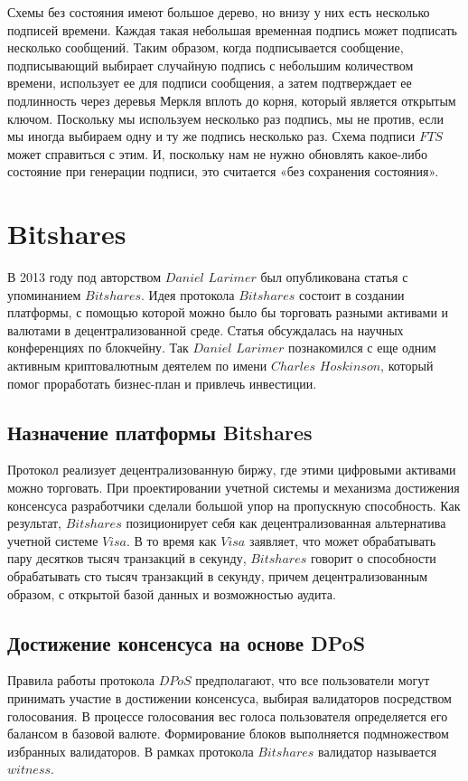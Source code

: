 \documentclass[a4paper, 14pt]{extarticle}
\begin{document}
Схемы без состояния имеют большое дерево, но внизу у них есть несколько подписей времени. Каждая такая небольшая временная подпись может подписать несколько сообщений. Таким образом, когда подписывается сообщение, подписывающий выбирает случайную подпись с небольшим количеством времени, использует ее для подписи сообщения, а затем подтверждает ее подлинность через деревья Меркля вплоть до корня, который является открытым ключом. Поскольку мы используем несколько раз подпись, мы не против, если мы иногда выбираем одну и ту же подпись несколько раз. Схема подписи $FTS$ может справиться с этим. И, поскольку нам не нужно обновлять какое-либо состояние при генерации подписи, это считается «без сохранения состояния».
\newpage

\section{Bitshares}
В 2013 году под авторством $Daniel$ $Larimer$ был опубликована статья с упоминанием $Bitshares$. Идея протокола $Bitshares$ состоит в создании платформы, с помощью которой можно было бы торговать разными активами и валютами в децентрализованной среде. Статья обсуждалась на научных конференциях по блокчейну. Так $Daniel$ $Larimer$ познакомился с еще одним активным криптовалютным деятелем по имени $Charles$ $Hoskinson$, который помог проработать бизнес-план и привлечь инвестиции.

\subsection{Назначение платформы Bitshares}
Протокол реализует децентрализованную биржу, где этими цифровыми активами можно торговать. При проектировании учетной системы и механизма достижения консенсуса разработчики сделали большой упор на пропускную способность. Как результат, $Bitshares$ позиционирует себя как децентрализованная альтернатива учетной системе $Visa$. В то время как $Visa$ заявляет, что может обрабатывать пару десятков тысяч транзакций в секунду, $Bitshares$ говорит о способности обрабатывать сто тысяч транзакций в секунду, причем децентрализованным образом, с открытой базой данных и возможностью аудита.

\subsection{Достижение консенсуса на основе DPoS}
Правила работы протокола $DPoS$ предполагают, что все пользователи могут принимать участие в достижении консенсуса, выбирая валидаторов посредством голосования. В процессе голосования вес голоса пользователя определяется его балансом в базовой валюте. Формирование блоков выполняется подмножеством избранных валидаторов. В рамках протокола $Bitshares$ валидатор называется $witness$.
\end{document}
